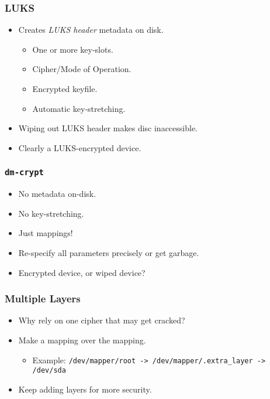\documentclass[xcolor={dvipsnames,svgnames},hyperref=dvips]{beamer}
\begin{document}
	\begin{frame}
		\frametitle{LUKS}
		\begin{itemize}
		\item Creates \textit{LUKS header} metadata on disk.
			\begin{itemize}
			\item One or more key-slots.
			\item Cipher/Mode of Operation.
			\item Encrypted keyfile.
			\item Automatic key-stretching.
			\end{itemize}
		\item Wiping out LUKS header makes disc inaccessible.
		\item Clearly a LUKS-encrypted device.
		\end{itemize}
	\end{frame}

	\begin{frame}
		\frametitle{\texttt{dm-crypt}}
		\begin{itemize}
		\item No metadata on-disk.
		\item No key-stretching.
		\item Just mappings!
		\item Re-specify all parameters precisely or get garbage.
		\item Encrypted device, or wiped device?
		\end{itemize}
	\end{frame}

	\begin{frame}
		\frametitle{Multiple Layers}
		\begin{itemize}
		\item Why rely on one cipher that may get cracked?
		\item Make a mapping over the mapping.
			\begin{itemize}
			\item Example: \texttt{/dev/mapper/root -> /dev/mapper/.extra\_layer -> /dev/sda}
			\end{itemize}
		\item Keep adding layers for more security.
		\end{itemize}
	\end{frame}
\end{document}
